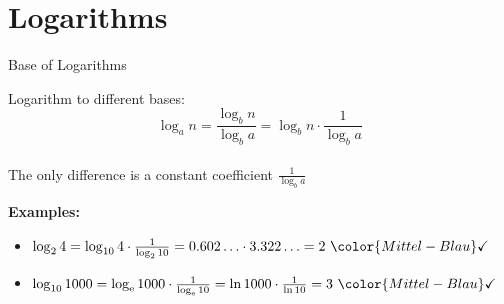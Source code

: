 \section{Logarithms}

\begin{frame}{Base of Logarithms}
  \begin{block}{Logarithm to different bases:}
    \begin{displaymath}
      \log_a n = \dfrac{\log_b n}{\log_b a}
      = \log_b n \cdot \dfrac{1}{\log_b a}
    \end{displaymath}\\[0.5em]
    The only difference is a constant coefficient $\frac{1}{\log_b a}$
  \end{block}
  \textbf{Examples:}
  \begin{itemize}
    \item
      \begin{math}
        \log_2 4
        = \log_{10} 4 \cdot \frac{1}{\log_2 10}
        = 0.602 \ldots \cdot 3.322 \ldots
        = 2 ~{\color{Mittel-Blau}\checkmark}
      \end{math}
    \item
      \begin{math}
        \log_{10} 1000
        = \log_{\mathrm{e}} 1000 \cdot \frac{1}{\log_{\mathrm{e}} 10}
        = \ln 1000 \cdot \frac{1}{\ln 10}
        = 3 ~{\color{Mittel-Blau}\checkmark}
      \end{math}
  \end{itemize}
\end{frame}


